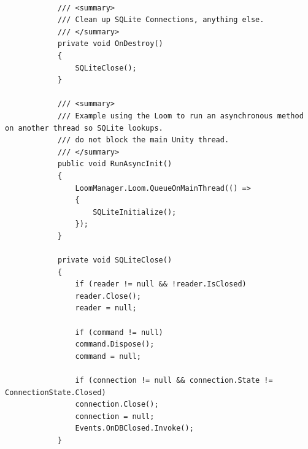 \begin{verbatim}
			
			/// <summary>
			/// Clean up SQLite Connections, anything else.
			/// </summary>
			private void OnDestroy()
			{
				SQLiteClose();
			}
			
			/// <summary>
			/// Example using the Loom to run an asynchronous method on another thread so SQLite lookups.
			/// do not block the main Unity thread.
			/// </summary>
			public void RunAsyncInit()
			{
				LoomManager.Loom.QueueOnMainThread(() =>
				{
					SQLiteInitialize();
				});
			}
			
			private void SQLiteClose()
			{
				if (reader != null && !reader.IsClosed)
				reader.Close();
				reader = null;
				
				if (command != null)
				command.Dispose();
				command = null;
				
				if (connection != null && connection.State != ConnectionState.Closed)
				connection.Close();
				connection = null;
				Events.OnDBClosed.Invoke();
			}
\end{verbatim}

